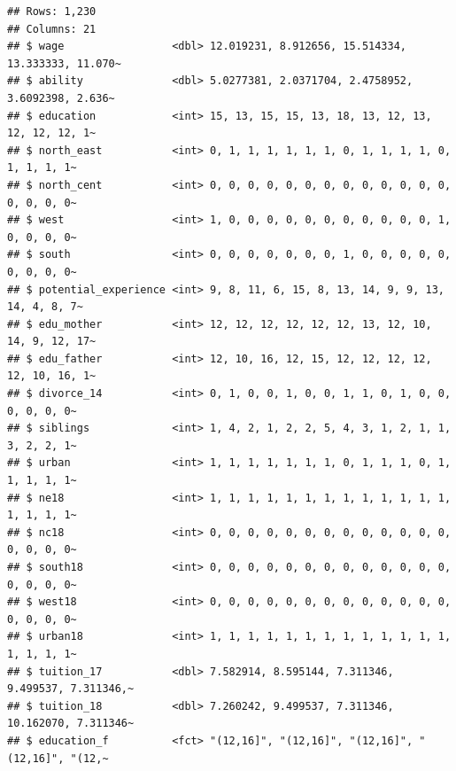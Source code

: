 \documentclass[
]{book}
\theoremstyle{definition}
\theoremstyle{definition}
\theoremstyle{definition}
\theoremstyle{definition}
\theoremstyle{remark}
\begin{document}
\begin{verbatim}
## Rows: 1,230
## Columns: 21
## $ wage                 <dbl> 12.019231, 8.912656, 15.514334, 13.333333, 11.070~
## $ ability              <dbl> 5.0277381, 2.0371704, 2.4758952, 3.6092398, 2.636~
## $ education            <int> 15, 13, 15, 15, 13, 18, 13, 12, 13, 12, 12, 12, 1~
## $ north_east           <int> 0, 1, 1, 1, 1, 1, 1, 0, 1, 1, 1, 1, 0, 1, 1, 1, 1~
## $ north_cent           <int> 0, 0, 0, 0, 0, 0, 0, 0, 0, 0, 0, 0, 0, 0, 0, 0, 0~
## $ west                 <int> 1, 0, 0, 0, 0, 0, 0, 0, 0, 0, 0, 0, 1, 0, 0, 0, 0~
## $ south                <int> 0, 0, 0, 0, 0, 0, 0, 1, 0, 0, 0, 0, 0, 0, 0, 0, 0~
## $ potential_experience <int> 9, 8, 11, 6, 15, 8, 13, 14, 9, 9, 13, 14, 4, 8, 7~
## $ edu_mother           <int> 12, 12, 12, 12, 12, 12, 13, 12, 10, 14, 9, 12, 17~
## $ edu_father           <int> 12, 10, 16, 12, 15, 12, 12, 12, 12, 12, 10, 16, 1~
## $ divorce_14           <int> 0, 1, 0, 0, 1, 0, 0, 1, 1, 0, 1, 0, 0, 0, 0, 0, 0~
## $ siblings             <int> 1, 4, 2, 1, 2, 2, 5, 4, 3, 1, 2, 1, 1, 3, 2, 2, 1~
## $ urban                <int> 1, 1, 1, 1, 1, 1, 1, 0, 1, 1, 1, 0, 1, 1, 1, 1, 1~
## $ ne18                 <int> 1, 1, 1, 1, 1, 1, 1, 1, 1, 1, 1, 1, 1, 1, 1, 1, 1~
## $ nc18                 <int> 0, 0, 0, 0, 0, 0, 0, 0, 0, 0, 0, 0, 0, 0, 0, 0, 0~
## $ south18              <int> 0, 0, 0, 0, 0, 0, 0, 0, 0, 0, 0, 0, 0, 0, 0, 0, 0~
## $ west18               <int> 0, 0, 0, 0, 0, 0, 0, 0, 0, 0, 0, 0, 0, 0, 0, 0, 0~
## $ urban18              <int> 1, 1, 1, 1, 1, 1, 1, 1, 1, 1, 1, 1, 1, 1, 1, 1, 1~
## $ tuition_17           <dbl> 7.582914, 8.595144, 7.311346, 9.499537, 7.311346,~
## $ tuition_18           <dbl> 7.260242, 9.499537, 7.311346, 10.162070, 7.311346~
## $ education_f          <fct> "(12,16]", "(12,16]", "(12,16]", "(12,16]", "(12,~
\end{verbatim}
\end{document}
